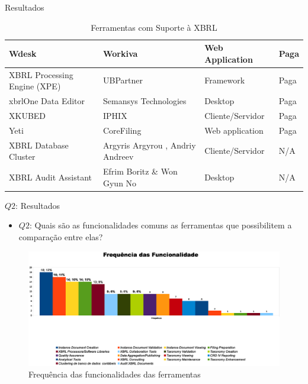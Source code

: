 \documentclass[t,14pt,mathserif]{beamer}
\begin{document}
\begin{frame}{Resultados}
\begin{table}[htb]
{\begin{tabular}{|l|l|l|l|}
Wdesk                                             & Workiva                                     & Web Application                           & Paga                                  \\ \hline
XBRL Processing Engine (XPE)                      & UBPartner                                   & Framework                                 & Paga                                  \\ \hline
xbrlOne Data Editor                               & Semansys Technologies                       & Desktop                                   & Paga                                  \\ \hline
XKUBED                                            & IPHIX                                       & Cliente/Servidor                          & Paga                                  \\ \hline
Yeti                                              & CoreFiling                                  & Web application                           & Paga                                  \\ \hline
XBRL Database Cluster                             & Argyris Argyrou , Andriy Andreev            & Cliente/Servidor                          & N/A                                   \\ \hline
XBRL Audit Assistant                              & Efrim Boritz \& Won Gyun No                 & Desktop                                   & N/A                                   \\ \hline
\end{tabular}
}
\caption{Ferramentas com Suporte à XBRL}
\label{tab:ferramentas}
\end{table}

\end{frame}
\begin{frame}{$Q2$: Resultados}
    \begin{itemize}
      \item {$Q2$: Quais são as funcionalidades comuns as ferramentas
    que possibilitem a comparação entre elas?}
    \end{itemize}
\begin{figure}[htb]
\centering
\includegraphics[width=.85\textwidth]{../img/graph_funcionalidades.eps}
\caption{Frequência das funcionalidades das ferramentas}
\label{fig:funcionalidades}
\end{figure}
\end{frame}
\end{document}
